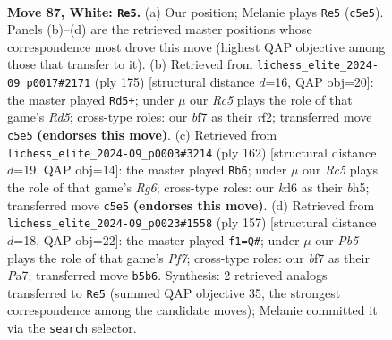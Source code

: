 \documentclass[11pt]{article}
\begin{document}
\clearpage

\begin{figure}[p]\centering
\begin{subfigure}{0.46\textwidth}\centering
\resizebox{\linewidth}{!}{%
\newchessgame
\chessboard[
  setfen={1R6/5br1/3k4/1PR5/4K3/8/8/8 w - - 1 87},
  showmover=false,
  pgfstyle=straightmove, color=movearrow, markmove={c5-e5}
]}
\caption{}
\end{subfigure}\hfill
\begin{subfigure}{0.46\textwidth}\centering
\resizebox{\linewidth}{!}{%
\newchessgame
\chessboard[
  setfen={8/8/4k3/2K5/3r3p/8/5R2/8 b - - 2 88},
  showmover=false,
  pgfstyle=straightmove, color=movearrow, markmove={d4-d5}
]}
\caption{}
\end{subfigure}
\\[4pt]
\begin{subfigure}{0.46\textwidth}\centering
\resizebox{\linewidth}{!}{%
\newchessgame
\chessboard[
  setfen={8/k7/P5R1/2K4b/8/8/8/8 w - - 1 82},
  showmover=false,
  pgfstyle=straightmove, color=movearrow, markmove={g6-b6}
]}
\caption{}
\end{subfigure}\hfill
\begin{subfigure}{0.46\textwidth}\centering
\resizebox{\linewidth}{!}{%
\newchessgame
\chessboard[
  setfen={8/p7/8/8/8/8/4rpk1/3K4 b - - 1 79},
  showmover=false,
  pgfstyle=straightmove, color=movearrow, markmove={f2-f1}
]}
\caption{}
\end{subfigure}
\caption{\textbf{Move 87, White: \texttt{Re5}.} (a) Our position; Melanie plays \texttt{Re5} (\texttt{c5e5}). Panels (b)--(d) are the retrieved master positions whose correspondence most drove this move (highest QAP objective among those that transfer to it). (b) Retrieved from \texttt{lichess\_elite\_2024-09\_p0017\#2171} (ply 175) [structural distance $d$=16, QAP obj=20]: the master played \texttt{Rd5+}; under $\mu$ our \emph{Rc5} plays the role of that game's \emph{Rd5}; cross-type roles: our \emph{b}f7 as their \emph{r}f2; transferred move \texttt{c5e5} \textbf{(endorses this move)}. (c) Retrieved from \texttt{lichess\_elite\_2024-09\_p0003\#3214} (ply 162) [structural distance $d$=19, QAP obj=14]: the master played \texttt{Rb6}; under $\mu$ our \emph{Rc5} plays the role of that game's \emph{Rg6}; cross-type roles: our \emph{k}d6 as their \emph{b}h5; transferred move \texttt{c5e5} \textbf{(endorses this move)}. (d) Retrieved from \texttt{lichess\_elite\_2024-09\_p0023\#1558} (ply 157) [structural distance $d$=18, QAP obj=22]: the master played \texttt{f1=Q\#}; under $\mu$ our \emph{Pb5} plays the role of that game's \emph{Pf7}; cross-type roles: our \emph{b}f7 as their \emph{P}a7; transferred move \texttt{b5b6}. Synthesis: 2 retrieved analogs transferred to \texttt{Re5} (summed QAP objective 35, the strongest correspondence among the candidate moves); Melanie committed it via the \texttt{search} selector.}
\label{fig:thought-m172}
\end{figure}
\end{document}
